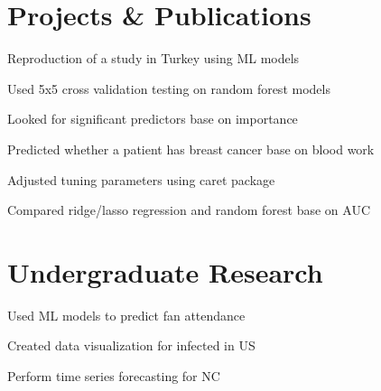 \begin{minipage}[t]{0.66\textwidth} %

\Large
\section{Projects \& Publications}
\Large
{}
\vspace{\topsep} %
\begin{tightitemize}
\item Reproduction of a study in Turkey using ML models
\item Used 5x5 cross validation testing on random forest models
\item Looked for significant predictors base on importance
\end{tightitemize}

\sectionspace %


\begin{tightitemize}
\item Predicted whether a patient has breast cancer base on blood work
\item Adjusted tuning parameters using caret package
\item Compared ridge/lasso regression and random forest base on AUC
\end{tightitemize}
\sectionspace %

\Large
\section{Undergraduate Research}
\Large

\vspace{\topsep} %
\begin{tightitemize}
\item Used ML models to predict fan attendance
\item Created data visualization for infected in US
\item Perform time series forecasting for NC
\end{tightitemize}



\end{minipage}
